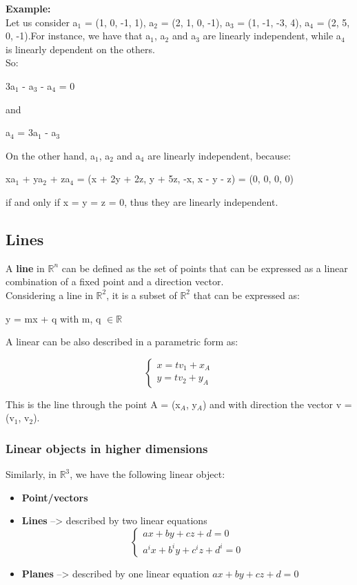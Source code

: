 \noindent
\textbf{Example:}\\
Let us consider a$_1$ = (1, 0, -1, 1), a$_2$ = (2, 1, 0, -1), a$_3$ = (1, -1, -3, 4), a$_4$ = (2, 5, 0, -1).For instance, we have that a$_1$, a$_2$ and a$_3$ are linearly independent, while a$_4$ is linearly dependent on the others. \\
So:
\begin{center}
    3a$_1$ - a$_3$ - a$_4$ = 0
\end{center}
\noindent
and
\begin{center}
    a$_4$ = 3a$_1$ - a$_3$
\end{center}

\noindent
On the other hand, a$_1$, a$_2$ and a$_4$ are linearly independent, because:
\begin{center}
    xa$_1$ + ya$_2$ + za$_4$ = (x + 2y + 2z, y + 5z, -x, x - y - z) = (0, 0, 0, 0)
\end{center}
\noindent
if and only if x = y = z = 0, thus they are linearly independent.



\subsection{Lines}
A \textbf{line} in $\mathbb{R}^n$ can be defined as the set of points that can be expressed as a linear combination of a fixed point and a direction vector.\\
Considering a line in $\mathbb{R}^2$, it is a subset of $\mathbb{R}^2$ that can be expressed as:
\begin{center}
    y = mx + q with m, q $\in \mathbb{R}$
\end{center}
\medskip

\noindent
A linear can be also described in a parametric form as:
\begin{center}
    \[
    \begin{cases}
    x= tv_1 + x_A \\
    y= tv_2 + y_A
    \end{cases}
    \]
\end{center}
\noindent
This is the line through the point A = (x$_A$, y$_A$) and with direction the vector v = (v$_1$, v$_2$).

\subsubsection*{Linear objects in higher dimensions}
Similarly, in $\mathbb{R}^3$, we have the following linear object:
\begin{itemize}
    \item \textbf{Point/vectors}
    \item \textbf{Lines} --> described by two linear equations   \[
    \begin{cases}
    ax + by + cz + d =0 \\
    a^ix + b^iy + c^iz + d^i =0
    \end{cases}
    \]

    \item \textbf{Planes} --> described by one linear equation $ax + by + cz + d =0$
\end{itemize}

